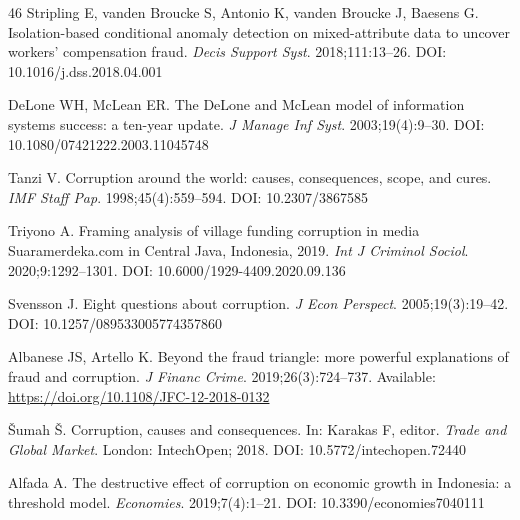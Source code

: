 \documentclass[3p,times,procedia]{elsarticle}
\begin{document}
\begin{thebibliography}{46}
Stripling E, vanden Broucke S, Antonio K, vanden Broucke J, Baesens G. Isolation-based conditional anomaly detection on mixed-attribute data to uncover workers' compensation fraud. \textit{Decis Support Syst}. 2018;111:13--26. DOI: 10.1016/j.dss.2018.04.001

DeLone WH, McLean ER. The DeLone and McLean model of information systems success: a ten-year update. \textit{J Manage Inf Syst}. 2003;19(4):9--30. DOI: 10.1080/07421222.2003.11045748

Tanzi V. Corruption around the world: causes, consequences, scope, and cures. \textit{IMF Staff Pap}. 1998;45(4):559--594. DOI: 10.2307/3867585

Triyono A. Framing analysis of village funding corruption in media Suaramerdeka.com in Central Java, Indonesia, 2019. \textit{Int J Criminol Sociol}. 2020;9:1292--1301. DOI: 10.6000/1929-4409.2020.09.136

Svensson J. Eight questions about corruption. \textit{J Econ Perspect}. 2005;19(3):19--42. DOI: 10.1257/089533005774357860

Albanese JS, Artello K. Beyond the fraud triangle: more powerful explanations of fraud and corruption. \textit{J Financ Crime}. 2019;26(3):724--737. Available: \url{https://doi.org/10.1108/JFC-12-2018-0132}

\v{S}umah \v{S}. Corruption, causes and consequences. In: Karakas F, editor. \textit{Trade and Global Market}. London: IntechOpen; 2018. DOI: 10.5772/intechopen.72440

Alfada A. The destructive effect of corruption on economic growth in Indonesia: a threshold model. \textit{Economies}. 2019;7(4):1--21. DOI: 10.3390/economies7040111

\end{thebibliography}
\end{document}
